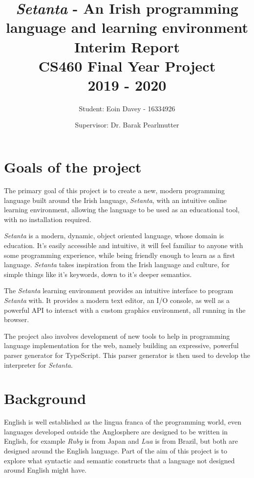 \documentclass[11pt]{extarticle}
\newcommand{\Setanta}{\emph{Setanta}}
\begin{document}
    \title{
    \huge \Setanta{} - An Irish programming language and learning environment\\
    \Large Interim Report\\
    \large CS460 Final Year Project\\
    2019 - 2020}
    \author{\Large Student: Eoin Davey - 16334926 \and \Large Supervisor: Dr. Barak Pearlmutter}
    \maketitle
    \section*{Goals of the project}

        The primary goal of this project is to create a new, modern programming language built around the Irish language, \Setanta{}, with an intuitive online learning environment, allowing the language to be used as an educational tool, with no installation required.

        \Setanta{} is a modern, dynamic, object oriented language, whose domain is education. It's easily accessible and intuitive, it will feel familiar to anyone with some programming experience, while being friendly enough to learn as a first language. \Setanta{} takes inspiration from the Irish language and culture, for simple things like it's keywords, down to it's deeper semantics.

        The \Setanta{} learning environment provides an intuitive interface to program \Setanta{} with. It provides a modern text editor, an I/O console, as well as a powerful API to interact with a custom graphics environment, all running in the browser.

        The project also involves development of new tools to help in programming language implementation for the web, namely building an expressive, powerful parser generator for TypeScript. This parser generator is then used to develop the interpreter for \Setanta{}.

    \section*{Background}

        English is well established as the lingua franca of the programming world, even languages developed outside the Anglosphere are designed to be written in English, for example \emph{Ruby} is from Japan and \emph{Lua} is from Brazil, but both are designed around the English language. Part of the aim of this project is to explore what syntactic and semantic constructs that a language not designed around English might have.
\end{document}
